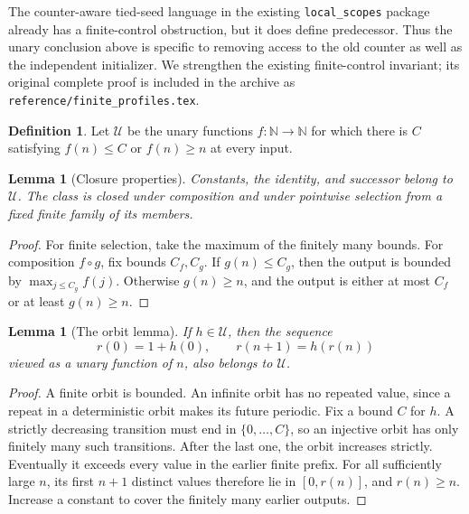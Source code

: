 \documentclass[11pt]{article}
\newtheorem{lemma}[theorem]{Lemma}
\theoremstyle{definition}
\newtheorem{definition}[theorem]{Definition}
\newcommand{\file}[1]{{\small\nolinkurl{#1}}}
\begin{document}
The counter-aware tied-seed language in the existing
\texttt{local\_scopes} package already has a finite-control obstruction, but
it does define predecessor. Thus the unary conclusion above is specific to
removing access to the old counter as well as the independent initializer.
We strengthen the existing finite-control invariant; its original complete
proof is included in the archive as
\file{reference/finite_profiles.tex}.

\begin{definition}
Let $\mathcal U$ be the unary functions $f:\mathbb N\to\mathbb N$ for which
there is $C$ satisfying $f(n)\leq C$ or $f(n)\geq n$ at every input.
\end{definition}

\begin{lemma}[Closure properties]
Constants, the identity, and successor belong to $\mathcal U$. The class is
closed under composition and under pointwise selection from a fixed finite
family of its members.
\end{lemma}
\begin{proof}
For finite selection, take the maximum of the finitely many bounds. For
composition $f\circ g$, fix bounds $C_f,C_g$. If $g(n)\leq C_g$, then the
output is bounded by $\max_{j\leq C_g}f(j)$. Otherwise $g(n)\geq n$, and
the output is either at most $C_f$ or at least $g(n)\geq n$.
\end{proof}

\begin{lemma}[The orbit lemma]
If $h\in\mathcal U$, then the sequence
\[
 r(0)=1+h(0),\qquad r(n+1)=h(r(n))
\]
viewed as a unary function of $n$, also belongs to $\mathcal U$.
\end{lemma}
\begin{proof}
A finite orbit is bounded. An infinite orbit has no repeated value, since
a repeat in a deterministic orbit makes its future periodic. Fix a bound
$C$ for $h$. A strictly decreasing transition must end in
$\{0,\ldots,C\}$, so an injective orbit has only finitely many such
transitions. After the last one, the orbit increases strictly. Eventually
it exceeds every value in the earlier finite prefix. For all sufficiently
large $n$, its first $n+1$ distinct values therefore lie in
$[0,r(n)]$, and $r(n)\geq n$. Increase a constant to cover the finitely many
earlier outputs.
\end{proof}
\end{document}
